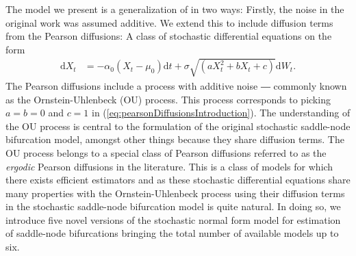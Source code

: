 The model we present is a generalization of \cite[equation (1)]{Ditlevsen2023} in two ways: Firstly, the noise in the original work was assumed additive. We extend this to include diffusion terms from the Pearson diffusions: A class of stochastic differential equations on the form
\begin{align}
    \mathrm{d}X_t &= -\alpha_0\left(X_t - \mu_0\right)\mathrm{d}t + \sigma\sqrt{\left(aX_t^2 + bX_t + c\right)}\mathrm{d}W_t. \label{eq:pearsonDiffusionsIntroduction}
\end{align}
The Pearson diffusions include a process with additive noise ― commonly known as the Ornstein-Uhlenbeck (OU) process. This process corresponds to picking $a = b = 0$ and $c = 1$ in (\ref{eq:pearsonDiffusionsIntroduction}). The understanding of the OU process is central to the formulation of the original stochastic saddle-node bifurcation model, amongst other things because they share diffusion terms. The OU process belongs to a special class of Pearson diffusions referred to as the \textit{ergodic} Pearson diffusions in the literature. This is a class of models for which there exists efficient estimators and as these stochastic differential equations share many properties with the Ornstein-Uhlenbeck process using their diffusion terms in the stochastic saddle-node bifurcation model is quite natural. In doing so, we introduce five novel versions of the stochastic normal form model for estimation of saddle-node bifurcations bringing the total number of available models up to six.


